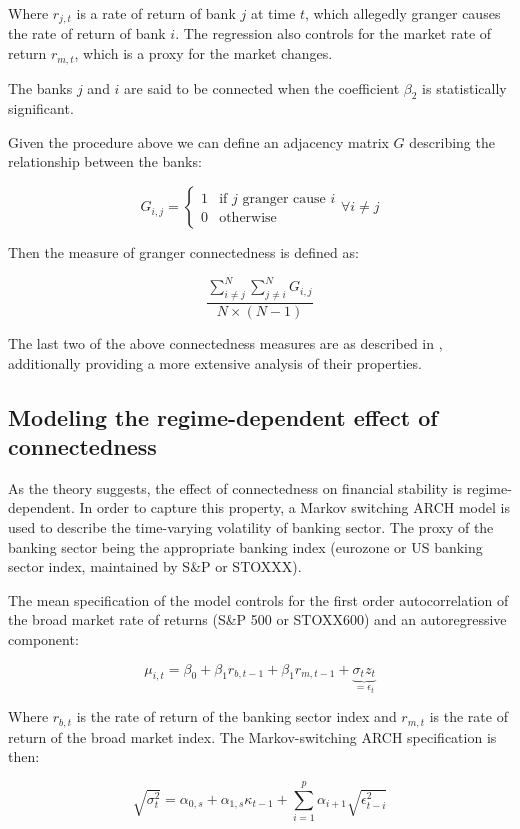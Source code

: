 \documentclass{article}
\begin{document}
Where $r_{j, t}$ is a rate of return of bank $j$ at time $t$, which allegedly granger causes the rate of return of bank $i$. The regression also controls for the market rate of return $r_{m, t}$, which is a proxy for the market changes.

The banks $j$ and $i$ are said to be connected when the coefficient $\beta_2$ is statistically significant. 

Given the procedure above we can define an adjacency matrix $G$ describing the relationship between the banks:

\[G_{i,j} = \begin{cases}
    1  & \text{if } j \text{ granger cause } i \\
    0 & \text{otherwise}
  \end{cases} \forall i \neq j\]

Then the measure of granger connectedness is defined as:

\[\frac{\sum_{i \neq j}^{N} \sum_{j \neq i}^{N} G_{i,j}}{ N \times (N-1)}\]

The last two of the above connectedness measures are as described in \citet{billio}, additionally providing a more extensive analysis of their properties.

\subsection*{Modeling the regime-dependent effect of connectedness}

As the theory suggests, the effect of connectedness on financial stability is regime-dependent. In order to capture this property, a Markov switching ARCH model is used to describe the time-varying volatility of banking sector. The proxy of the banking sector being the appropriate banking index (eurozone or US banking sector index, maintained by S\&P or STOXXX).

The mean specification of the model controls for the first order autocorrelation of the broad market rate of returns (S\&P 500 or STOXX600) and an autoregressive component:

\[\mu_{i,t} = \beta_0 + \beta_1 r_{b,t-1} + \beta_1 r_{m,t-1} + \underbrace{\sigma_t z_t}_{=\epsilon_t}\]

Where $r_{b,t}$ is the rate of return of the banking sector index and $r_{m,t}$ is the rate of return of the broad market index. The Markov-switching ARCH specification is then:

\[\sqrt{\sigma^2_t} = \alpha_{0,s} + \alpha_{1,s} \kappa_{t-1} + \sum_{i=1}^{p} \alpha_{i+1} \sqrt{\epsilon^2_{t-i}}\]
\end{document}

